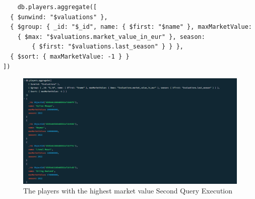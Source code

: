 \documentclass{Configuration_Files/PoliMi3i_thesis}
\begin{document}
\begin{verbatim}
    db.players.aggregate([
  { $unwind: "$valuations" },
  { $group: { _id: "$_id", name: { $first: "$name" }, maxMarketValue: 
    { $max: "$valuations.market_value_in_eur" }, season: 
        { $first: "$valuations.last_season" } } },
  { $sort: { maxMarketValue: -1 } }
])
\end{verbatim}
\begin{figure}[htbp]
    \centering
    \includegraphics[scale=0.8]{Images/Queries/Highest_value_players/2.png}
    \caption{The players with the highest market value Second Query Execution}
\end{figure}
\end{document}
